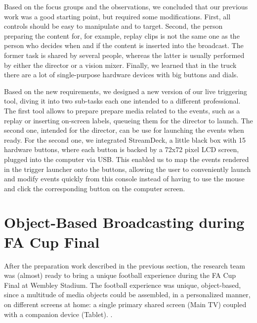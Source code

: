 \documentclass[sigchi-a, authorversion]{acmart}
\begin{document}
Based on the focus groups and the observations, we concluded that our previous work was a good starting point, but required some modifications. First, all controls should be easy to manipulate and to target. Second, the person preparing the content for, for example, replay clips is not the same one as the person who decides when and if the content is inserted into the broadcast. The former task is shared by several people, whereas the latter is usually performed by either the director or a vision mixer. Finally, we learned that in the truck there are a lot of single-purpose hardware devices with big buttons and dials.

Based on the new requirements, we designed a new version of our live triggering tool, diving it into two sub-tasks each one intended to a different professional. The first tool allows to prepare prepare media related to the events, such as a replay or inserting on-screen labels, queueing them for the director to launch. The second one, intended for the director, can be use for launching the events when ready. For the second one, we integrated StreamDeck, a little black box with 15 hardware buttons, where each button is backed by a 72x72 pixel LCD screen, plugged into the computer via USB. This enabled us to map the events rendered in the trigger launcher onto the buttons, allowing the user to conveniently launch and modify events quickly from this console instead of having to use the mouse and click the corresponding button on the computer screen.

\section{Object-Based Broadcasting during FA Cup Final}
After the preparation work described in the previous section, the research team was (almost) ready to bring a unique football experience during the FA Cup Final at Wembley Stadium. The football experience was unique, object-based, since a multitude of media objects could be assembled, in a personalized manner, on different screens at home: a single primary shared screen (Main TV) coupled with a companion device (Tablet).
. 

\end{document}
